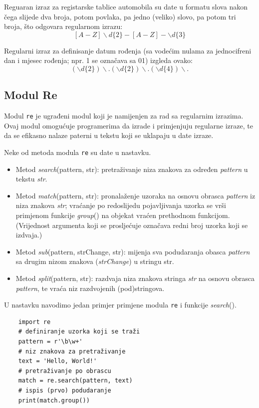 Reguaran izraz za registarske tablice automobila su date u formatu slova nakon čega slijede dva broja, potom povlaka, pa jedno (veliko) slovo, pa potom tri broja, što odgovara regularnom izrazu:
$$ [A-Z]\backslash d \{2\}-[A-Z]-\backslash d\{3\}$$

Regularni izraz za definisanje datum rođenja (sa vodećim nulama za jednocifreni dan i mjesec rođenja; npr. 1 se označava sa 01) izgleda ovako:
$$(\backslash d \{2\})\backslash.(\backslash d \{2\})\backslash.(\backslash d \{4\})\backslash. $$ 

\subsection{Modul Re}
Modul \texttt{re}  je ugrađeni modul koji je namijenjen za rad sa regularnim izrazima. Ovaj modul omogućuje programerima da izrade i primjenjuju regularne izraze, te da se efikasno nalaze paterni u tekstu koji se uklapaju u date izraze. 

Neke od metoda modula \texttt{re} su date u nastavku.
\begin{itemize}
	\item Metod \textit{search}(pattern, str): pretraživanje niza znakova za određen \textit{pattern} u tekstu \textit{str}.
	\item Metod \textit{match}(pattern, str): pronalaženje  uzoraka na osnovu obra\-sca \textit{pattern} iz niza znakova \emph{str}; vraćanje po redoslijedu pojavlji\-vanja   uzorka se vrši primjenom funkcije \emph{group}() na objekat vraćen prethodnom fu\-nkcijom. (Vrijednost argumenta koji se prosljećuje označava redni broj uzorka koji se izdvaja.)
	
	\item Metod \textit{sub}(pattern, strChange, str): mijenja sva podudaranja obasca \textit{pattern} sa drugim nizom znakova (\textit{strChange}) u stringu {str}.
	\item Metod \textit{split}(pattern, str): razdvaja  niza znakova stringa \emph{str} na osnovu  obrasca \emph{pattern}, te vraća niz razdvojenih (pod)stringova.
\end{itemize}
 
 U nastavku navodimo jedan primjer primjene modula \texttt{re} i funkcije \textit{search}().
 
 \begin{verbatim}
 	import re
 	# definiranje uzorka koji se traži
 	pattern = r'\b\w+'
 	# niz znakova za pretraživanje
 	text = 'Hello, World!'
 	# pretraživanje po obrascu
 	match = re.search(pattern, text)
 	# ispis (prvo) podudaranje
 	print(match.group()) 
\end{verbatim}

